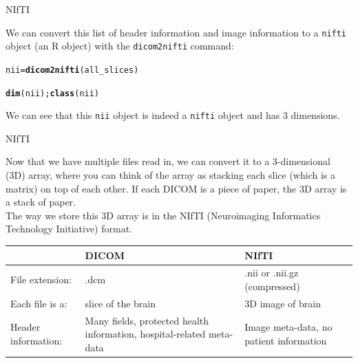 \documentclass[11pt]{beamer}\usepackage[]{graphicx}\usepackage[]{color}
\makeatletter
\newcommand{\hlstd}[1]{\textcolor[rgb]{0.345,0.345,0.345}{#1}}%
\newcommand{\hlkwb}[1]{\textcolor[rgb]{0.69,0.353,0.396}{#1}}%
\newcommand{\hlkwd}[1]{\textcolor[rgb]{0.737,0.353,0.396}{\textbf{#1}}}%
\newenvironment{kframe}{%
 \def\at@end@of@kframe{}%
 \ifinner\ifhmode%
  \def\at@end@of@kframe{\end{minipage}}%
  \begin{minipage}{\columnwidth}%
 \fi\fi%
 \def\FrameCommand##1{\hskip\@totalleftmargin \hskip-\fboxsep
 \colorbox{shadecolor}{##1}\hskip-\fboxsep
     \hskip-\linewidth \hskip-\@totalleftmargin \hskip\columnwidth}%
 \MakeFramed {\advance\hsize-\width
   \@totalleftmargin\z@ \linewidth\hsize
   \@setminipage}}%
 {\par\unskip\endMakeFramed%
 \at@end@of@kframe}
\newenvironment{knitrout}{}{} %
\makeatother
\begin{document}
\begin{frame}[fragile]{NIfTI}

We can convert this list of header information and image information to a \verb|nifti| object (an R object) with the \verb|dicom2nifti| command:
\begin{knitrout}
\color{fgcolor}\begin{kframe}
\begin{alltt}
\hlstd{nii} \hlkwb{=} \hlkwd{dicom2nifti}\hlstd{(all_slices)}
\end{alltt}


{\ttfamily\noindent\bfseries{}}\begin{alltt}
\hlkwd{dim}\hlstd{(nii);} \hlkwd{class}\hlstd{(nii)}
\end{alltt}


{\ttfamily\noindent\bfseries\color{errorcolor}{Error in eval(expr, envir, enclos): object 'nii' not found}}

{\ttfamily\noindent\bfseries\color{errorcolor}{Error in eval(expr, envir, enclos): object 'nii' not found}}\end{kframe}
\end{knitrout}
We can see that this \verb|nii| object is indeed a \verb|nifti| object and has 3 dimensions. 

\end{frame}

\begin{frame}[fragile]{NIfTI}

Now that we have multiple files read in, we can convert it to a 3-dimensional (3D) array, where you can think of the array as stacking each slice (which is a matrix) on top of each other.  If each DICOM is a piece of paper, the 3D array is a stack of paper.\\

The way we store this 3D array is in the NIfTI (Neuroimaging Informatics Technology Initiative) format.  \\

\begin{table}[h]
\begin{tabular}{m{}|m{}|m{}}
& DICOM & NIfTI \\ \hline
File extension: & .dcm & .nii or .nii.gz (compressed) \\
Each file is a: & slice of the brain & 3D image of brain \\
Header information: & Many fields, protected health information, hospital-related meta-data & Image meta-data, no patient information 
\end{tabular}
\end{table}
\end{frame}
\end{document}
